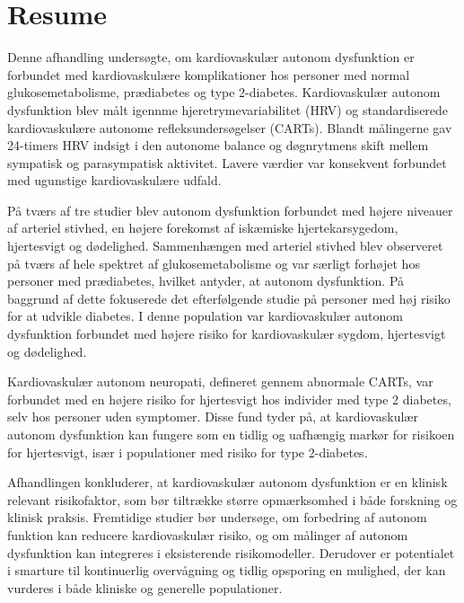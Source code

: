 \documentclass[
  a4paper,
  headsepline=true,
  open=any]{scrbook}
\begin{document}
\newpage


\hypertarget{resume}{%
\chapter*{Resume}\label{resume}}


Denne afhandling undersøgte, om kardiovaskulær autonom dysfunktion er
forbundet med kardiovaskulære komplikationer hos personer med normal
glukosemetabolisme, prædiabetes og type 2-diabetes. Kardiovaskulær
autonom dysfunktion blev målt igennme hjeretrymevariabilitet (HRV) og
standardiserede kardiovaskulære autonome refleksundersøgelser (CARTs).
Blandt målingerne gav 24-timers HRV indsigt i den autonome balance og
døgnrytmens skift mellem sympatisk og parasympatisk aktivitet. Lavere
værdier var konsekvent forbundet med ugunstige kardiovaskulære udfald.

På tværs af tre studier blev autonom dysfunktion forbundet med højere
niveauer af arteriel stivhed, en højere forekomst af iskæmiske
hjertekarsygedom, hjertesvigt og dødelighed. Sammenhængen med arteriel
stivhed blev observeret på tværs af hele spektret af glukosemetabolisme
og var særligt forhøjet hos personer med prædiabetes, hvilket antyder,
at autonom dysfunktion. På baggrund af dette fokuserede det
efterfølgende studie på personer med høj risiko for at udvikle diabetes.
I denne population var kardiovaskulær autonom dysfunktion forbundet med
højere risiko for kardiovaskulær sygdom, hjertesvigt og dødelighed.

Kardiovaskulær autonom neuropati, defineret gennem abnormale CARTs, var
forbundet med en højere risiko for hjertesvigt hos individer med type 2
diabetes, selv hos personer uden symptomer. Disse fund tyder på, at
kardiovaskulær autonom dysfunktion kan fungere som en tidlig og
uafhængig markør for risikoen for hjertesvigt, især i populationer med
risiko for type 2-diabetes.

Afhandlingen konkluderer, at kardiovaskulær autonom dysfunktion er en
klinisk relevant risikofaktor, som bør tiltrække større opmærksomhed i
både forskning og klinisk praksis. Fremtidige studier bør undersøge, om
forbedring af autonom funktion kan reducere kardiovaskulær risiko, og om
målinger af autonom dysfunktion kan integreres i eksisterende
risikomodeller. Derudover er potentialet i smarture til kontinuerlig
overvågning og tidlig opsporing en mulighed, der kan vurderes i både
kliniske og generelle populationer.
\end{document}
